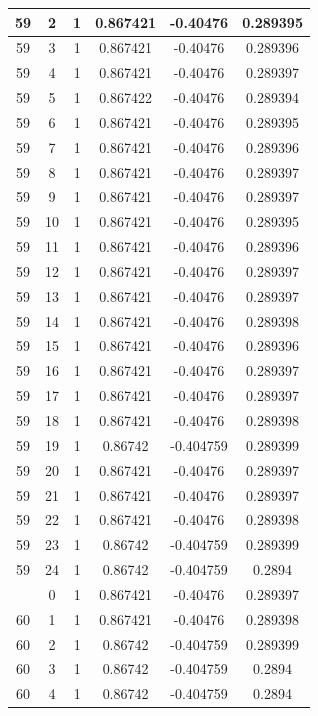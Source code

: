 \documentclass[12pt,a4paper]{article}
\numberwithin{equation}{section}
\numberwithin{figure}{section}
\numberwithin{table}{section}
\begin{document}
\begin{longtable}{|c|c|c|c|c|c|}
59 & 2 & 1 & 0.867421 & -0.40476 & 0.289395 \\ \hline
59 & 3 & 1 & 0.867421 & -0.40476 & 0.289396 \\ \hline
59 & 4 & 1 & 0.867421 & -0.40476 & 0.289397 \\ \hline
59 & 5 & 1 & 0.867422 & -0.40476 & 0.289394 \\ \hline
59 & 6 & 1 & 0.867421 & -0.40476 & 0.289395 \\ \hline
59 & 7 & 1 & 0.867421 & -0.40476 & 0.289396 \\ \hline
59 & 8 & 1 & 0.867421 & -0.40476 & 0.289397 \\ \hline
59 & 9 & 1 & 0.867421 & -0.40476 & 0.289397 \\ \hline
59 & 10 & 1 & 0.867421 & -0.40476 & 0.289395 \\ \hline
59 & 11 & 1 & 0.867421 & -0.40476 & 0.289396 \\ \hline
59 & 12 & 1 & 0.867421 & -0.40476 & 0.289397 \\ \hline
59 & 13 & 1 & 0.867421 & -0.40476 & 0.289397 \\ \hline
59 & 14 & 1 & 0.867421 & -0.40476 & 0.289398 \\ \hline
59 & 15 & 1 & 0.867421 & -0.40476 & 0.289396 \\ \hline
59 & 16 & 1 & 0.867421 & -0.40476 & 0.289397 \\ \hline
59 & 17 & 1 & 0.867421 & -0.40476 & 0.289397 \\ \hline
59 & 18 & 1 & 0.867421 & -0.40476 & 0.289398 \\ \hline
59 & 19 & 1 & 0.86742 & -0.404759 & 0.289399 \\ \hline
59 & 20 & 1 & 0.867421 & -0.40476 & 0.289397 \\ \hline
59 & 21 & 1 & 0.867421 & -0.40476 & 0.289397 \\ \hline
59 & 22 & 1 & 0.867421 & -0.40476 & 0.289398 \\ \hline
59 & 23 & 1 & 0.86742 & -0.404759 & 0.289399 \\ \hline
59 & 24 & 1 & 0.86742 & -0.404759 & 0.2894 \\ \hline
\pagebreak
60 & 0 & 1 & 0.867421 & -0.40476 & 0.289397 \\ \hline
60 & 1 & 1 & 0.867421 & -0.40476 & 0.289398 \\ \hline
60 & 2 & 1 & 0.86742 & -0.404759 & 0.289399 \\ \hline
60 & 3 & 1 & 0.86742 & -0.404759 & 0.2894 \\ \hline
60 & 4 & 1 & 0.86742 & -0.404759 & 0.2894 \\ \hline

\end{longtable}
\end{document}
